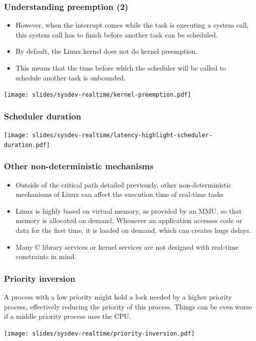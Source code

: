 \begin{frame}
  \frametitle{Understanding preemption (2)}
  \begin{itemize}
  \item However, when the interrupt comes while the task is executing
    a system call, this system call has to finish before another task
    can be scheduled.
  \item By default, the Linux kernel does not do kernel preemption.
  \item This means that the time before which the scheduler will be
    called to schedule another task is unbounded.
  \end{itemize}
  \begin{center}
    \texttt{[image: slides/sysdev-realtime/kernel-preemption.pdf]}
  \end{center}
\end{frame}

\begin{frame}
\frametitle{Scheduler duration}
  \begin{center}
    \texttt{[image: slides/sysdev-realtime/latency-highlight-scheduler-duration.pdf]}
  \end{center}
\end{frame}

\begin{frame}
  \frametitle{Other non-deterministic mechanisms}
  \begin{itemize}
  \item Outside of the critical path detailed previously, other
    non-deterministic mechanisms of Linux can affect the execution
    time of real-time tasks
  \item Linux is highly based on virtual memory, as provided by an
    MMU, so that memory is allocated on demand. Whenever an
    application accesses code or data for the first time, it is loaded
    on demand, which can creates huge delays.
  \item Many C library services or kernel services are not designed
    with real-time constraints in mind.
  \end{itemize}
\end{frame}

\begin{frame}
  \frametitle{Priority inversion}

  A process with a low priority might hold a lock needed by a higher
  priority process, effectively reducing the priority of this
  process. Things can be even worse if a middle priority process uses
  the CPU.

  \begin{center}
    \texttt{[image: slides/sysdev-realtime/priority-inversion.pdf]}
  \end{center}
\end{frame}

